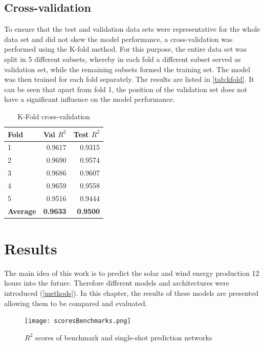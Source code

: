\documentclass[11pt,table]{article}
\begin{document}
\subsection{Cross-validation}
To ensure that the test and validation data sets were representative for the whole data set and did not skew the model performance, a cross-validation was performed using the K-fold method. For this purpose, the entire data set was split in 5 different subsets, whereby in each fold a different subset served as validation set, while the remaining subsets formed the training set. The model was then trained for each fold separately. The results are listed in \autoref{tab:kfold}. It can be seen that apart from fold 1, the position of the validation set does not have a significant influence on the model performance.

\begin{table}[ht]
\centering
\caption{K-Fold cross-validation}
\begin{tabular}{lrr}
\toprule
\textbf{Fold} & \textbf{Val} \boldmath$R^2$ & \textbf{Test} \boldmath$R^2$ \\ \midrule
1 & 0.9617 & 0.9315  \\
2 & 0.9690 & 0.9574  \\
3 & 0.9686 & 0.9607  \\
4 & 0.9659 & 0.9558  \\
5 & 0.9516 & 0.9444  \\ \midrule
\textbf{Average} & \textbf{0.9633} & \textbf{0.9500} \\ \bottomrule
\end{tabular}
\label{tab:kfold}
\end{table}

\section{Results}
The main idea of this work is to predict the solar and wind energy production 12 hours into the future. Therefore different models and architectures were introduced (\autoref{methods}). In this chapter, the results of these models are presented allowing them to be compared and evaluated. 

\begin{figure}[ht]
	\centering
	\texttt{[image: scoresBenchmarks.png]}
	\caption{$R^2$ scores of benchmark and single-shot prediction networks}
	\label{fig:benchmarks}
\end{figure} 
\end{document}
